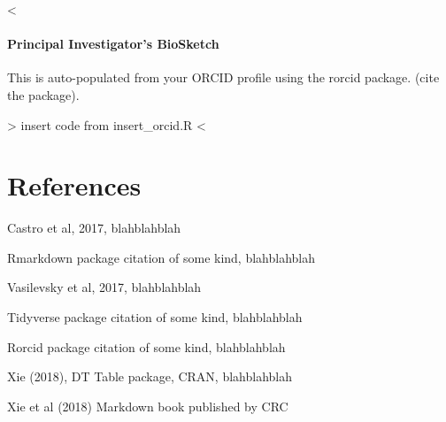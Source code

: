 \documentclass[]{article}
\let\oldparagraph\paragraph
\renewcommand{\paragraph}[1]{\oldparagraph{#1}\mbox{}}
\begin{document}
\textless{}\textbar{}\textbar{}

\paragraph{Principal Investigator's
BioSketch}\label{principal-investigators-biosketch}

This is auto-populated from your ORCID profile using the rorcid package.
(cite the package).

\textbar{}\textbar{}\textgreater{} insert code from insert\_orcid.R
\textless{}\textbar{}\textbar{}

\section{References}\label{references}

Castro et al, 2017, blahblahblah

Rmarkdown package citation of some kind, blahblahblah

Vasilevsky et al, 2017, blahblahblah

Tidyverse package citation of some kind, blahblahblah

Rorcid package citation of some kind, blahblahblah

Xie (2018), DT Table package, CRAN, blahblahblah

Xie et al (2018) Markdown book published by CRC
\end{document}

